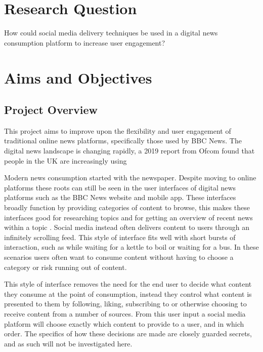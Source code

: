 \documentclass[12pt,titlepage]{article}
\begin{document}
\tableofcontents
\newpage

\section{Research Question}

How could social media delivery techniques be used in a digital news consumption platform to increase user engagement?

\section{Aims and Objectives}

  \subsection{Project Overview}

  This project aims to improve upon the flexibility and user engagement of traditional online news platforms, specifically those used by BBC News. The digital news landscape is changing rapidly, a 2019 report from Ofcom found that people in the UK are increasingly using 

  Modern news consumption started with the newspaper. Despite moving to online
  platforms these roots can still be seen in the user interfaces of digital news
  platforms such as the BBC News website and mobile app. These interfaces
  broadly function by providing categories of content to browse, this makes
  these interfaces good for researching topics and for getting an overview of
  recent news within a topic \cite{dummy}. Social media instead often delivers
  content to users through an infinitely scrolling feed. This style of interface
  fits well with short bursts of interaction, such as while waiting for a kettle
  to boil or waiting for a bus. In these scenarios users often want to consume
  content without having to choose a category or risk running out of content.

  This style of interface removes the need for the end user to decide what
  content they consume at the point of consumption, instead they control what
  content is presented to them by following, liking, subscribing to or otherwise
  choosing to receive content from a number of sources. From this user input a
  social media platform will choose exactly which content to provide to a user,
  and in which order. The specifics of how these decisions are made are closely
  guarded secrets, and as such will not be investigated here.
\end{document}

